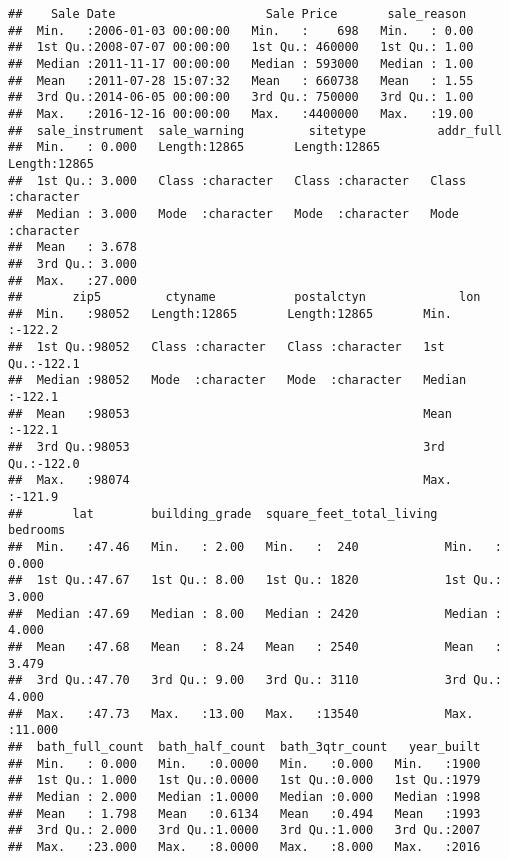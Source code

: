 \documentclass[
]{article}
\begin{document}
\begin{verbatim}
##    Sale Date                     Sale Price       sale_reason   
##  Min.   :2006-01-03 00:00:00   Min.   :    698   Min.   : 0.00  
##  1st Qu.:2008-07-07 00:00:00   1st Qu.: 460000   1st Qu.: 1.00  
##  Median :2011-11-17 00:00:00   Median : 593000   Median : 1.00  
##  Mean   :2011-07-28 15:07:32   Mean   : 660738   Mean   : 1.55  
##  3rd Qu.:2014-06-05 00:00:00   3rd Qu.: 750000   3rd Qu.: 1.00  
##  Max.   :2016-12-16 00:00:00   Max.   :4400000   Max.   :19.00  
##  sale_instrument  sale_warning         sitetype          addr_full        
##  Min.   : 0.000   Length:12865       Length:12865       Length:12865      
##  1st Qu.: 3.000   Class :character   Class :character   Class :character  
##  Median : 3.000   Mode  :character   Mode  :character   Mode  :character  
##  Mean   : 3.678                                                           
##  3rd Qu.: 3.000                                                           
##  Max.   :27.000                                                           
##       zip5         ctyname           postalctyn             lon        
##  Min.   :98052   Length:12865       Length:12865       Min.   :-122.2  
##  1st Qu.:98052   Class :character   Class :character   1st Qu.:-122.1  
##  Median :98052   Mode  :character   Mode  :character   Median :-122.1  
##  Mean   :98053                                         Mean   :-122.1  
##  3rd Qu.:98053                                         3rd Qu.:-122.0  
##  Max.   :98074                                         Max.   :-121.9  
##       lat        building_grade  square_feet_total_living    bedrooms     
##  Min.   :47.46   Min.   : 2.00   Min.   :  240            Min.   : 0.000  
##  1st Qu.:47.67   1st Qu.: 8.00   1st Qu.: 1820            1st Qu.: 3.000  
##  Median :47.69   Median : 8.00   Median : 2420            Median : 4.000  
##  Mean   :47.68   Mean   : 8.24   Mean   : 2540            Mean   : 3.479  
##  3rd Qu.:47.70   3rd Qu.: 9.00   3rd Qu.: 3110            3rd Qu.: 4.000  
##  Max.   :47.73   Max.   :13.00   Max.   :13540            Max.   :11.000  
##  bath_full_count  bath_half_count  bath_3qtr_count   year_built  
##  Min.   : 0.000   Min.   :0.0000   Min.   :0.000   Min.   :1900  
##  1st Qu.: 1.000   1st Qu.:0.0000   1st Qu.:0.000   1st Qu.:1979  
##  Median : 2.000   Median :1.0000   Median :0.000   Median :1998  
##  Mean   : 1.798   Mean   :0.6134   Mean   :0.494   Mean   :1993  
##  3rd Qu.: 2.000   3rd Qu.:1.0000   3rd Qu.:1.000   3rd Qu.:2007  
##  Max.   :23.000   Max.   :8.0000   Max.   :8.000   Max.   :2016  

\end{verbatim}
\end{document}
